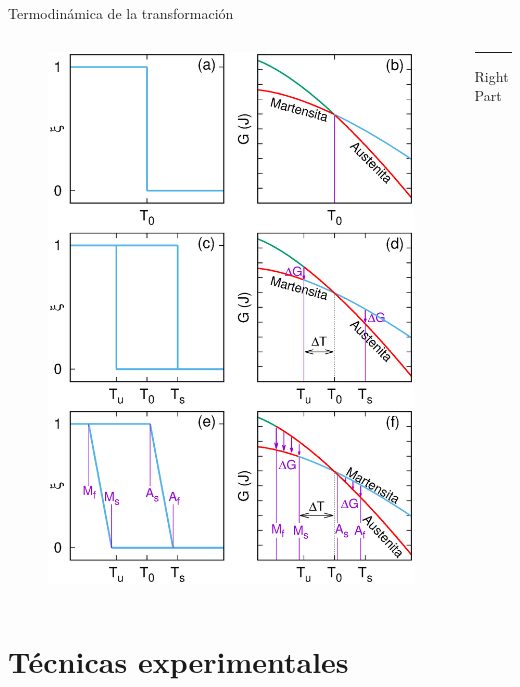 \documentclass[11pt]{beamer}
\begin{document}
		\begin{frame}{Termodinámica de la transformación}
			\begin{columns}[T] %
				\begin{column}{.48\textwidth}
					\begin{figure}
						\includegraphics[scale=0.2]{img/Termo.eps}
					\end{figure}
				\end{column}
				\hfill
				\begin{column}{.48\textwidth}
					\color{blue}\rule{\linewidth}{4pt}
					
					Right Part
				\end{column}
			\end{columns}
		\end{frame}

\section{Técnicas experimentales}
\end{document}
